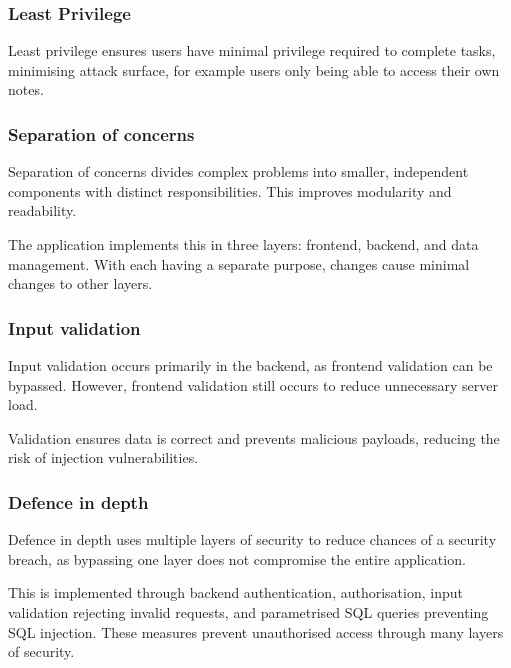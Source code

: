 \subsubsection{Least Privilege}

Least privilege ensures users have minimal privilege required to complete tasks, minimising attack surface, for example users only being able to access their own notes.

\subsubsection{Separation of concerns}

Separation of concerns divides complex problems into smaller, independent components with distinct responsibilities. This improves modularity and readability.

The application implements this in three layers: frontend, backend, and data management. With each having a separate purpose, changes cause minimal changes to other layers.

\subsubsection{Input validation}

Input validation occurs primarily in the backend, as frontend validation can be bypassed. However, frontend validation still occurs to reduce unnecessary server load.

Validation ensures data is correct and prevents malicious payloads, reducing the risk of injection vulnerabilities.

\subsubsection{Defence in depth}

Defence in depth uses multiple layers of security to reduce chances of a security breach, as bypassing one layer does not compromise the entire application.

This is implemented through backend authentication, authorisation, input validation rejecting invalid requests, and parametrised SQL queries preventing SQL injection. These measures prevent unauthorised access through many layers of security.